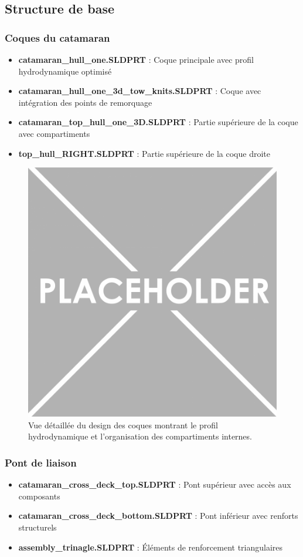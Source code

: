 {\subsection{Structure de base}
\subsubsection{Coques du catamaran}
\begin{itemize}
    \setlength{\itemsep}{.375em}
    \item \textbf{catamaran\_hull\_one.SLDPRT} : Coque principale avec profil hydrodynamique optimisé
    \item \textbf{catamaran\_hull\_one\_3d\_tow\_knits.SLDPRT} : Coque avec intégration des points de remorquage
    \item \textbf{catamaran\_top\_hull\_one\_3D.SLDPRT} : Partie supérieure de la coque avec compartiments
    \item \textbf{top\_hull\_RIGHT.SLDPRT} : Partie supérieure de la coque droite
\end{itemize}

\begin{figure}[!htpb]
    \centering
    \includegraphics[width=0.8\linewidth]{Figures/PezizaTuberosa.jpg}
    \caption[Design des coques]{Vue détaillée du design des coques montrant le profil hydrodynamique et l'organisation des compartiments internes.}
    \label{fig:hull-design}
\end{figure}

\subsubsection{Pont de liaison}
\begin{itemize}
    \setlength{\itemsep}{.375em}
    \item \textbf{catamaran\_cross\_deck\_top.SLDPRT} : Pont supérieur avec accès aux composants
    \item \textbf{catamaran\_cross\_deck\_bottom.SLDPRT} : Pont inférieur avec renforts structurels
    \item \textbf{assembly\_trinagle.SLDPRT} : Éléments de renforcement triangulaires
\end{itemize}

}
